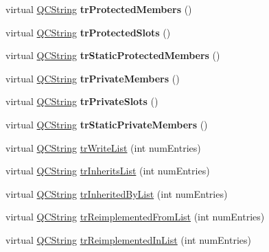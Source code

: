 \begin{DoxyCompactItemize}
virtual \mbox{\hyperlink{class_q_c_string}{Q\+C\+String}} {\bfseries tr\+Protected\+Members} ()
\item 
\mbox{\label{class_translator_japanese_a28c021d9e5c0ef097b7cc9ef8a307cbd}} 
virtual \mbox{\hyperlink{class_q_c_string}{Q\+C\+String}} {\bfseries tr\+Protected\+Slots} ()
\item 
\mbox{\label{class_translator_japanese_a51128f9bc7f1647ca231d869c79d9e89}} 
virtual \mbox{\hyperlink{class_q_c_string}{Q\+C\+String}} {\bfseries tr\+Static\+Protected\+Members} ()
\item 
\mbox{\label{class_translator_japanese_a64edcf5abd0076ac8e33825f366c4071}} 
virtual \mbox{\hyperlink{class_q_c_string}{Q\+C\+String}} {\bfseries tr\+Private\+Members} ()
\item 
\mbox{\label{class_translator_japanese_ace65727509c8910d2aaf2f501cfcc78b}} 
virtual \mbox{\hyperlink{class_q_c_string}{Q\+C\+String}} {\bfseries tr\+Private\+Slots} ()
\item 
\mbox{\label{class_translator_japanese_a46c4b0f187212b955f6438dabb8129e3}} 
virtual \mbox{\hyperlink{class_q_c_string}{Q\+C\+String}} {\bfseries tr\+Static\+Private\+Members} ()
\item 
virtual \mbox{\hyperlink{class_q_c_string}{Q\+C\+String}} \mbox{\hyperlink{class_translator_japanese_a2d1dcae8604927539b593930394dd6dd}{tr\+Write\+List}} (int num\+Entries)
\item 
virtual \mbox{\hyperlink{class_q_c_string}{Q\+C\+String}} \mbox{\hyperlink{class_translator_japanese_a591e1b53f07df66db75f27177d15cd4e}{tr\+Inherits\+List}} (int num\+Entries)
\item 
virtual \mbox{\hyperlink{class_q_c_string}{Q\+C\+String}} \mbox{\hyperlink{class_translator_japanese_acacdae5b68f4284239a14ab975cfec20}{tr\+Inherited\+By\+List}} (int num\+Entries)
\item 
virtual \mbox{\hyperlink{class_q_c_string}{Q\+C\+String}} \mbox{\hyperlink{class_translator_japanese_a8aa7007e007b8e7adb8c8fcb950ed871}{tr\+Reimplemented\+From\+List}} (int num\+Entries)
\item 
virtual \mbox{\hyperlink{class_q_c_string}{Q\+C\+String}} \mbox{\hyperlink{class_translator_japanese_a77d748f2a9f3ddc7dc3f9cc0e6a48c69}{tr\+Reimplemented\+In\+List}} (int num\+Entries)

\end{DoxyCompactItemize}
